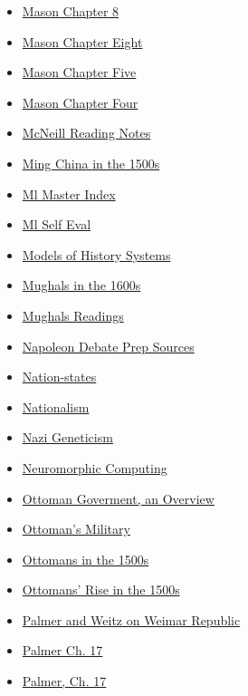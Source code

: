 \documentclass[11pt]{article}
\begin{document}
\begin{itemize}
\begin{itemize}
\begin{itemize}
\item \href{history/history10/KBhHIST201MasonCh8.org}{Mason Chapter 8}
\item \href{history/history10/KBxMasonCh8.org}{Mason Chapter Eight}
\item \href{history/history10/KBxHIST201MasonCh5n7.org}{Mason Chapter Five}
\item \href{history/history10/KBxMasonCh4.org}{Mason Chapter Four}
\item \href{history/history10/KBMcNeill.org}{McNeill Reading Notes}
\item \href{history/history10/KBhHIST201MingChina1500.org}{Ming China in the 1500s}
\item \href{history/history10/KBMlMasterIndex.org}{Ml Master Index}
\item \href{history/history10/KBMlSelfEval.org}{Ml Self Eval}
\item \href{history/history10/KBhHIST201HistModHist.org}{Models of History Systems}
\item \href{history/history10/KBhHIST201Mughals1600s.org}{Mughals in the 1600s}
\item \href{history/history10/KBe20hist201MughalsReadings.org}{Mughals Readings}
\item \href{history/history10/KBhHIST201NapoleonDebatePrep.org}{Napoleon Debate Prep Sources}
\item \href{history/history10/KBhHIST201NationStates.org}{Nation-states}
\item \href{history/history10/KBhHIST201Nationalism.org}{Nationalism}
\item \href{history/history10/Kbe21hist201floNaziGeneticism.org}{Nazi Geneticism}
\item \href{history/history10/KBxNeuromorphicComputing.org}{Neuromorphic Computing}
\item \href{history/history10/KBhHIST201OttomanGovmntOverview.org}{Ottoman Goverment, an Overview}
\item \href{history/history10/KBOttomansMilitary.org}{Ottoman's Military}
\item \href{history/history10/KBhHIST201Ottomans1500.org}{Ottomans in the 1500s}
\item \href{history/history10/KBhHIST201OttomansRise.org}{Ottomans' Rise in the 1500s}
\item \href{history/history10/KBxWeimarRepublic.org}{Palmer and Weitz on Weimar Republic}
\item \href{history/history10/KBxPalmerCH17.org}{Palmer Ch. 17}
\item \href{history/history10/KBhHIST201PalmerCh17.org}{Palmer, Ch. 17}

\end{itemize}
\end{itemize}
\end{itemize}
\end{document}
